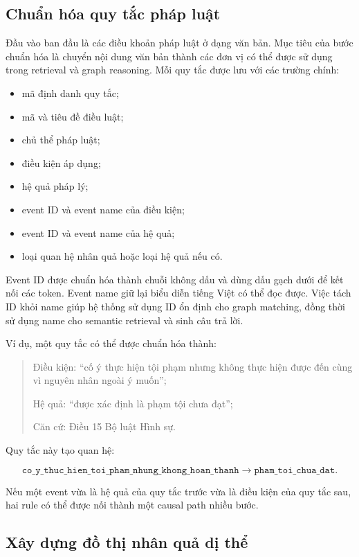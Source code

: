 \subsection{Chuẩn hóa quy tắc pháp luật}

Đầu vào ban đầu là các điều khoản pháp luật ở dạng văn bản. Mục tiêu của
bước chuẩn hóa là chuyển nội dung văn bản thành các đơn vị có thể được sử
dụng trong retrieval và graph reasoning. Mỗi quy tắc được lưu với các trường
chính:

\begin{itemize}
    \item mã định danh quy tắc;
    \item mã và tiêu đề điều luật;
    \item chủ thể pháp luật;
    \item điều kiện áp dụng;
    \item hệ quả pháp lý;
    \item event ID và event name của điều kiện;
    \item event ID và event name của hệ quả;
    \item loại quan hệ nhân quả hoặc loại hệ quả nếu có.
\end{itemize}

Event ID được chuẩn hóa thành chuỗi không dấu và dùng dấu gạch dưới để kết
nối các token. Event name giữ lại biểu diễn tiếng Việt có thể đọc được. Việc
tách ID khỏi name giúp hệ thống sử dụng ID ổn định cho graph matching, đồng
thời sử dụng name cho semantic retrieval và sinh câu trả lời.

Ví dụ, một quy tắc có thể được chuẩn hóa thành:

\begin{quote}
Điều kiện: ``cố ý thực hiện tội phạm nhưng không thực hiện được đến cùng vì
nguyên nhân ngoài ý muốn'';

Hệ quả: ``được xác định là phạm tội chưa đạt'';

Căn cứ: Điều 15 Bộ luật Hình sự.
\end{quote}

Quy tắc này tạo quan hệ:

\[
\texttt{co\_y\_thuc\_hien\_toi\_pham\_nhung\_khong\_hoan\_thanh}
\rightarrow
\texttt{pham\_toi\_chua\_dat}.
\]

Nếu một event vừa là hệ quả của quy tắc trước vừa là điều kiện của quy tắc
sau, hai rule có thể được nối thành một causal path nhiều bước.

\subsection{Xây dựng đồ thị nhân quả dị thể}

